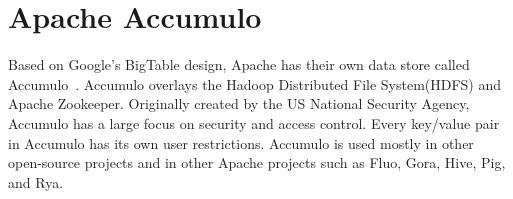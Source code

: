 \section{Apache Accumulo}

Based on Google's BigTable design, Apache has their own
data store called Accumulo~\cite{hid-sp18-526-www-apache-accumulo}.
Accumulo overlays the Hadoop Distributed File System(HDFS) and
Apache Zookeeper. Originally created by the US National Security
Agency, Accumulo has a large focus on security and access control. 
Every key/value pair in Accumulo has its own user restrictions. 
Accumulo is used mostly in other open-source projects and in other 
Apache projects such as Fluo, Gora, Hive, Pig, and Rya.

